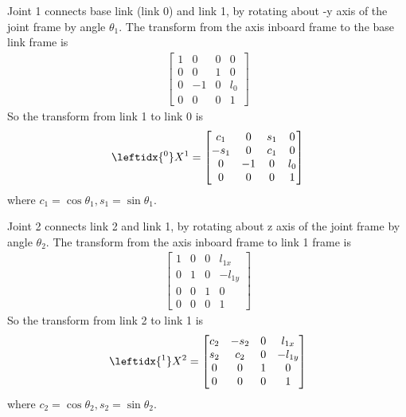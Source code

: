 \documentclass{article}
\begin{document}
Joint 1 connects base link (link 0) and link 1, by rotating about -y axis of the joint frame by angle $\theta_1$. The transform from the axis inboard frame to the base link frame is 
\begin{align}
	\begin{bmatrix}1 & 0 & 0 & 0\\
		       0 & 0 & 1 & 0\\
			0 & -1 & 0 & l_0\\
	               0 & 0 & 0 & 1\end{bmatrix}
\end{align}
So the transform from link 1 to link 0 is
\begin{align}
\leftidx{^0}X^1 = \begin{bmatrix}c_1& 0 & s_1 & 0\\
                                -s_1& 0 & c_1 & 0\\
                                  0 & -1&  0  & l_0\\
                                  0 & 0 &  0  & 1\end{bmatrix}
\end{align}
where $c_1 = \cos\theta_1, s_1=\sin\theta_1$.

Joint 2 connects link 2 and link 1, by rotating about  z axis of the joint frame by angle $\theta_2$. The transform from the axis inboard frame to link 1 frame is
\begin{align}
	\begin{bmatrix}
		1 & 0 & 0 & l_{1x}\\
		0 & 1 & 0 & -l_{1y}\\
		0 & 0 & 1 & 0\\
		0 & 0 & 0 & 1
	\end{bmatrix}
\end{align}
So the transform from link 2 to link 1 is
\begin{align}
\leftidx{^1}X^2 = \begin{bmatrix}
	c_2 & -s_2 & 0  & l_{1x}\\
	s_2 & c_2  & 0  & -l_{1y}\\
	0   &  0   & 1  & 0\\
	0   & 0    & 0  & 1
		\end{bmatrix}
\end{align}
where $c_2 = \cos\theta_2, s_2 = \sin\theta_2$.
\end{document}
